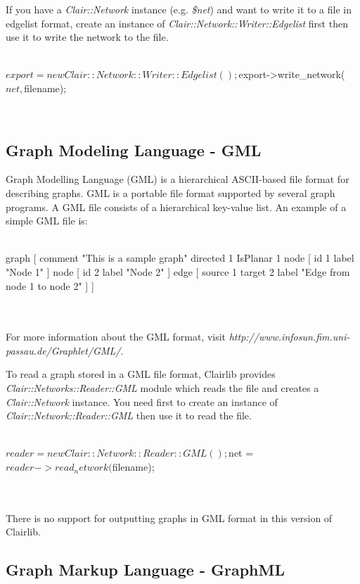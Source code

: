 If you have a \emph{Clair::Network} instance (e.g. \emph{\$net}) and want to write it to a file in edgelist format, create an instance of \emph{Clair::Network::Writer::Edgelist} first then use it to write the network to the file.
\\
\\
\begin{boxedverbatim}
$export = new Clair::Network::Writer::Edgelist();
$export->write_network($net, $filename);
\end{boxedverbatim}
\\
\subsection{Graph Modeling Language - GML}

Graph Modelling Language (GML) is a hierarchical ASCII-based file format for describing graphs. GML is a portable file format supported by several graph programs. A GML file consists of a hierarchical key-value list. An example of a simple GML file is:
\\
\\
\begin{boxedverbatim}
graph [
  comment "This is a sample graph"
  directed 1
  IsPlanar 1
  node [
    id 1
    label
    "Node 1"
  ]
  node [
    id 2
    label
    "Node 2"
  ]
  edge [
    source 1
    target 2
    label "Edge from node 1 to node 2"
  ]
]
\end{boxedverbatim}
\\
\\
For more information about the GML format, visit \emph{http://www.infosun.fim.uni-passau.de/Graphlet/GML/}.

To read a graph stored in a GML file format, Clairlib provides \emph{Clair::Networks::Reader::GML} module which reads the file and creates a \emph{Clair::Network} instance. You need first to create an instance of \emph{Clair::Network::Reader::GML} then use it to read the file.
\\
\\
\begin{boxedverbatim}
$reader = new Clair::Network::Reader::GML();
$net = $reader->read_network($filename);
\end{boxedverbatim}
\\
\\
There is no support for outputting graphs in GML format in this version of Clairlib.

\subsection{Graph Markup Language - GraphML}


